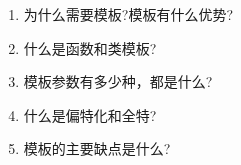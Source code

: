 \begin{enumerate}
\item
为什么需要模板?模板有什么优势?

\item
什么是函数和类模板?

\item
模板参数有多少种，都是什么?

\item
什么是偏特化和全特?

\item
模板的主要缺点是什么?
\end{enumerate}